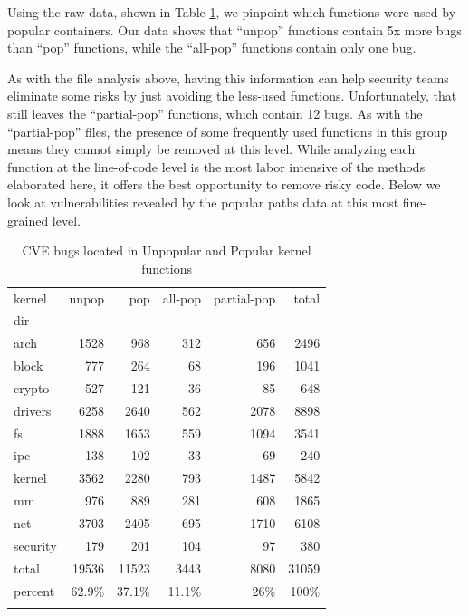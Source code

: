 Using the raw data, shown in Table \ref{tab:cve_functions}, we pinpoint which functions were used by popular containers. 
Our data shows that ``unpop'' functions contain 5x more bugs than ``pop'' functions, while the ``all-pop'' functions contain only one bug. 

As with the file analysis above, having this information can help security teams eliminate some risks by just avoiding the less-used functions. 
Unfortunately, that still leaves the ``partial-pop'' functions, which  contain 12 bugs.  As with the ``partial-pop'' files, 
the presence of some frequently used functions in this group means they cannot  simply be removed at this level. 
While analyzing each function at the line-of-code level is the most labor intensive of the methods elaborated here, it offers the best opportunity to remove risky code. 
Below we look at vulnerabilities revealed by the popular paths data at this most fine-grained level. 

\begin{table}
\caption{CVE bugs located in Unpopular and Popular kernel functions}
\label{tab:cve_functions}
\begin{tabular}{l|r|r|r|r|r}
 kernel & unpop & pop & all-pop & partial-pop & total \\
 dir & \color{red}{(CVEs)} & \color{red}{(CVEs)} & \color{red}{(CVEs)} & \color{red}{(CVEs)} & \\
 \hline
 arch & 1528\color{red}{(7)} & 968\color{red}{(1)} & 312 & 656\color{red}{(1)} & 2496 \\
 \hline
 block & 777 & 264 & 68 & 196 & 1041 \\
 \hline
 crypto & 527\color{red}{(6)} & 121 & 36 & 85 & 648 \\
 \hline
 drivers & 6258\color{red}{(20)} & 2640 & 562 & 2078 & 8898 \\
 \hline
 fs & 1888\color{red}{(13)} & 1653\color{red}{(3)} & 559 & 1094\color{red}{(3)} & 3541 \\
 \hline
 ipc & 138 & 102 & 33 & 69 & 240 \\
 \hline
 kernel & 3562\color{red}{(8)} & 2280 & 793 & 1487 & 5842 \\
 \hline
 mm & 976\color{red}{(2)} & 889\color{red}{(6)} & 281 & 608\color{red}{(6)} & 1865 \\
 \hline
 net & 3703\color{red}{(9)} & 2405\color{red}{(3)} & 695\color{red}{(1)} & 1710\color{red}{(2)} & 6108 \\
 \hline
 security & 179 & 201 & 104 & 97 & 380 \\
 \hline
 total & 19536\color{red}{(65)} & 11523\color{red}{(13)} & 3443\color{red}{(1)} & 8080\color{red}{(12)} & 31059 \\
 \hline 
 percent & 62.9\% & 37.1\% & 11.1\% & 26\% & 100\% \\
 & \color{red}{(83.3\%)} & \color{red}{(16.7\%)} & \color{red}{(1.3\%)} & \color{red}{(15.4\%)} &
\end{tabular}
\end{table}

